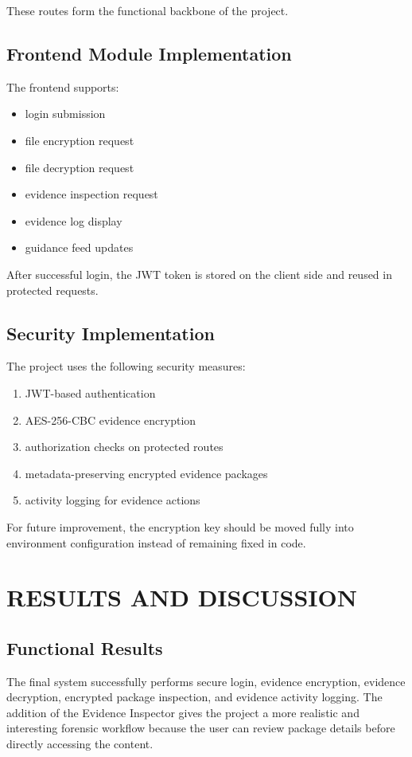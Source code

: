 \documentclass[12pt,a4paper]{report}
\begin{document}
These routes form the functional backbone of the project.

\section{Frontend Module Implementation}
The frontend supports:

\begin{itemize}
\item login submission
\item file encryption request
\item file decryption request
\item evidence inspection request
\item evidence log display
\item guidance feed updates
\end{itemize}

After successful login, the JWT token is stored on the client side and reused in protected requests.

\section{Security Implementation}
The project uses the following security measures:

\begin{enumerate}
\item JWT-based authentication
\item AES-256-CBC evidence encryption
\item authorization checks on protected routes
\item metadata-preserving encrypted evidence packages
\item activity logging for evidence actions
\end{enumerate}

For future improvement, the encryption key should be moved fully into environment configuration instead of remaining fixed in code.

\chapter{RESULTS AND DISCUSSION}

\section{Functional Results}
The final system successfully performs secure login, evidence encryption, evidence decryption, encrypted package inspection, and evidence activity logging. The addition of the Evidence Inspector gives the project a more realistic and interesting forensic workflow because the user can review package details before directly accessing the content.
\end{document}
